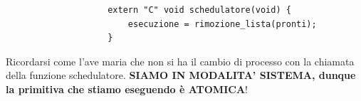\begin{itemize}
\begin{itemize}
\begin{framed}
\begin{itemize}
\begin{verbatim}
					extern "C" void schedulatore(void) {
						esecuzione = rimozione_lista(pronti);	
					}
				\end{verbatim}
			\end{itemize}
			Ricordarsi come l'ave maria che non si ha il cambio di processo con la chiamata della funzione schedulatore. \textbf{SIAMO IN MODALITA' SISTEMA, dunque la primitiva che stiamo eseguendo è ATOMICA}!\end{framed}
	\end{itemize}
\end{itemize}